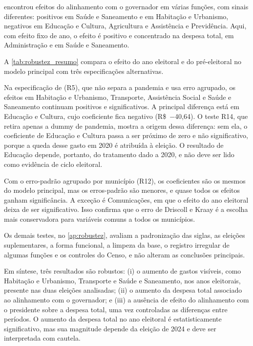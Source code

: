 \textcite{sakurai2009} encontrou efeitos do alinhamento com o governador em várias funções, com sinais diferentes: positivos em Saúde e Saneamento e em Habitação e Urbanismo, negativos em Educação e Cultura, Agricultura e Assistência e Previdência. Aqui, com efeito fixo de ano, o efeito é positivo e concentrado na despesa total, em Administração e em Saúde e Saneamento.

A \autoref{tab:robustez_resumo} compara o efeito do ano eleitoral e do pré-eleitoral no modelo principal com três especificações alternativas.

Na especificação de \textcite{sakurai2009} (R5), que não separa a pandemia e usa erro agrupado, os efeitos em Habitação e Urbanismo, Transporte, Assistência Social e Saúde e Saneamento continuam positivos e significativos. A principal diferença está em Educação e Cultura, cujo coeficiente fica negativo (R\$~$-$40,64). O teste R14, que retira apenas a dummy de pandemia, mostra a origem dessa diferença: sem ela, o coeficiente de Educação e Cultura passa a ser próximo de zero e não significativo, porque a queda desse gasto em 2020 é atribuída à eleição. O resultado de Educação depende, portanto, do tratamento dado a 2020, e não deve ser lido como evidência de ciclo eleitoral.

Com o erro-padrão agrupado por município (R12), os coeficientes são os mesmos do modelo principal, mas os erros-padrão são menores, e quase todos os efeitos ganham significância. A exceção é Comunicações, em que o efeito do ano eleitoral deixa de ser significativo. Isso confirma que o erro de Driscoll e Kraay é a escolha mais conservadora para variáveis comuns a todos os municípios.

Os demais testes, no \autoref{ap:robustez}, avaliam a padronização das siglas, as eleições suplementares, a forma funcional, a limpeza da base, o registro irregular de algumas funções e os controles do Censo, e não alteram as conclusões principais.

Em síntese, três resultados são robustos: (i) o aumento de gastos visíveis, como Habitação e Urbanismo, Transporte e Saúde e Saneamento, nos anos eleitorais, presente nas duas eleições analisadas; (ii) o aumento da despesa total associado ao alinhamento com o governador; e (iii) a ausência de efeito do alinhamento com o presidente sobre a despesa total, uma vez controladas as diferenças entre períodos. O aumento da despesa total no ano eleitoral é estatisticamente significativo, mas sua magnitude depende da eleição de 2024 e deve ser interpretada com cautela.
